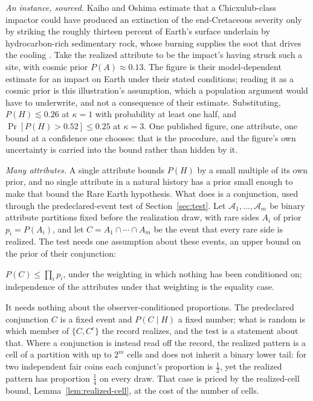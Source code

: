 \textit{An instance, sourced.} Kaiho and Oshima estimate that a Chicxulub-class impactor could have produced an extinction of the end-Cretaceous severity only by striking the roughly thirteen percent of Earth's surface underlain by hydrocarbon-rich sedimentary rock, whose burning supplies the soot that drives the cooling \cite{Kaiho2017}. Take the realized attribute to be the impact's having struck such a site, with cosmic prior $P(A) \approx 0.13$. The figure is their model-dependent estimate for an impact on Earth under their stated conditions; reading it as a cosmic prior is this illustration's assumption, which a population argument would have to underwrite, and not a consequence of their estimate. Substituting, $P(H) \lesssim 0.26$ at $\kappa = 1$ with probability at least one half, and $\Pr[P(H) > 0.52] \le 0.25$ at $\kappa = 3$. One published figure, one attribute, one bound at a confidence one chooses: that is the procedure, and the figure's own uncertainty is carried into the bound rather than hidden by it.

\textit{Many attributes.} A single attribute bounds $P(H)$ by a small multiple of its own prior, and no single attribute in a natural history has a prior small enough to make that bound the Rare Earth hypothesis. What does is a conjunction, used through the predeclared-event test of Section~\ref{sec:test}. Let $\mathcal{A}_1, \dots, \mathcal{A}_m$ be binary attribute partitions fixed before the realization draw, with rare sides $A_i$ of prior $p_i = P(A_i)$, and let $C = A_1 \cap \cdots \cap A_m$ be the event that every rare side is realized. The test needs one assumption about these events, an upper bound on the prior of their conjunction:
\begin{description}[leftmargin=3.2em, style=nextline, itemsep=0.2em]
\item[(A1) Cosmic submultiplicativity.] $P(C) \le \prod_i p_i$, under the weighting in which nothing has been conditioned on; independence of the attributes under that weighting is the equality case.
\end{description}
\noindent It needs nothing about the observer-conditioned proportions. The predeclared conjunction $C$ is a fixed event and $P(C \mid H)$ a fixed number; what is random is which member of $\{C, C^{c}\}$ the record realizes, and the test is a statement about that. Where a conjunction is instead read off the record, the realized pattern is a cell of a partition with up to $2^m$ cells and does not inherit a binary lower tail: for two independent fair coins each conjunct's proportion is $\tfrac12$, yet the realized pattern has proportion $\tfrac14$ on every draw. That case is priced by the realized-cell bound, Lemma~\ref{lem:realized-cell}, at the cost of the number of cells.



